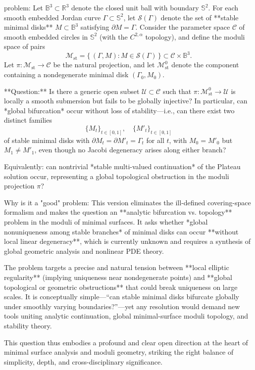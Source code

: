 problem:  
Let $\mathbb{B}^{3}\subset \mathbb{R}^{3}$ denote the closed unit ball with boundary $\mathbb{S}^{2}$.  
For each smooth embedded Jordan curve $\Gamma\subset \mathbb{S}^{2}$, let $\mathcal{S}(\Gamma)$ denote the set of **stable minimal disks** $M\subset \mathbb{B}^{3}$ satisfying $\partial M=\Gamma$.  
Consider the parameter space $\mathcal{C}$ of smooth embedded circles in $\mathbb{S}^{2}$ (with the $C^{2,\alpha}$ topology), and define the moduli space of pairs
\[
\mathcal{M}_{\mathrm{st}} = \{\, (\Gamma, M) : M \in \mathcal{S}(\Gamma)\, \} \subset \mathcal{C} \times \mathbb{B}^{3}.
\]  
Let $\pi:\mathcal{M}_{\mathrm{st}}\to \mathcal{C}$ be the natural projection, and let $\mathcal{M}_{\mathrm{st}}^0$ denote the component containing a nondegenerate minimal disk $(\Gamma_0,M_0)$.

**Question:**  
Is there a generic open subset $\mathcal{U}\subset \mathcal{C}$ such that $\pi:\mathcal{M}_{\mathrm{st}}^0\to \mathcal{U}$ is locally a smooth submersion but fails to be globally injective?  
In particular, can *global bifurcation* occur without loss of stability—i.e., can there exist two distinct families  
\[
\{M_t\}_{t\in[0,1]} ,\quad \{M'_t\}_{t\in[0,1]}
\]
of stable minimal disks with $\partial M_t = \partial M'_t = \Gamma_t$ for all $t$, with $M_0=M'_0$ but $M_1\neq M'_1$, even though no Jacobi degeneracy arises along either branch?  

Equivalently: can nontrivial *stable multi-valued continuation* of the Plateau solution occur, representing a global topological obstruction in the moduli projection $\pi$?

Why is it a "good" problem:  
This version eliminates the ill-defined covering-space formalism and makes the question an **analytic bifurcation vs. topology** problem in the moduli of minimal surfaces. It asks whether *global nonuniqueness among stable branches* of minimal disks can occur **without local linear degeneracy**, which is currently unknown and requires a synthesis of global geometric analysis and nonlinear PDE theory.  

The problem targets a precise and natural tension between **local elliptic regularity** (implying uniqueness near nondegenerate points) and **global topological or geometric obstructions** that could break uniqueness on large scales. It is conceptually simple—“can stable minimal disks bifurcate globally under smoothly varying boundaries?”—yet any resolution would demand new tools uniting analytic continuation, global minimal-surface moduli topology, and stability theory.  

This question thus embodies a profound and clear open direction at the heart of minimal surface analysis and moduli geometry, striking the right balance of simplicity, depth, and cross-disciplinary significance.